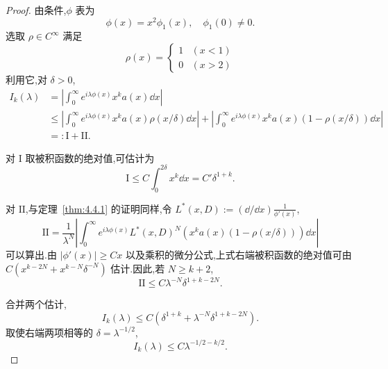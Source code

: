 \begin{proof}
由条件,$\phi$ 表为
\begin{equation*}
\phi(x) = x^{2}\phi_{1}(x), \quad \phi_{1}(0) \neq 0.
\end{equation*}
选取 $\rho \in C^{\infty}$ 满足
\begin{equation*}
\rho(x) = \begin{cases} 1 & (x < 1) \\ 0 & (x > 2) \end{cases}
\end{equation*}
利用它,对 $\delta > 0$,
\begin{equation}
\begin{aligned}
I_{k}(\lambda) & = \left|\int_{0}^{\infty}e^{i\lambda\phi(x)}x^{k}a(x)\dd x\right| \\
& \leq \left|\int_{0}^{\infty}e^{i\lambda\phi(x)}x^{k}a(x)\rho(x/\delta)\dd x\right| + \left|\int_{0}^{\infty}e^{i\lambda\phi(x)}x^{k}a(x)(1 - \rho(x/\delta))\dd x\right| \\
& =: \mathrm{I} + \mathrm{II}.
\end{aligned}
\end{equation}

对 $\mathrm{I}$ 取被积函数的绝对值,可估计为
\begin{equation*}
\mathrm{I} \leq C\int_{0}^{2\delta}x^{k}\dd x = C'\delta^{1+k}.
\end{equation*}

对 $\mathrm{II}$,与定理~\ref{thm:4.4.1} 的证明同样,令 $L^{*}(x, D) := (\dd/\dd x)\frac{1}{\phi'(x)}$,
\begin{equation*}
\mathrm{II} = \frac{1}{\lambda^{N}}\left|\int_{0}^{\infty}e^{i\lambda\phi(x)}L^{*}(x, D)^{N}\left(x^{k}a(x)(1 - \rho(x/\delta))\right)\dd x\right|
\end{equation*}
可以算出.由 $|\phi'(x)| \geq Cx$ 以及乘积的微分公式,上式右端被积函数的绝对值可由 $C(x^{k-2N} + x^{k-N}\delta^{-N})$ 估计.因此,若 $N \geq k + 2$,
\begin{equation*}
\mathrm{II} \leq C\lambda^{-N}\delta^{1+k-2N}.
\end{equation*}

合并两个估计,
\begin{equation*}
I_{k}(\lambda) \leq C\left(\delta^{1+k} + \lambda^{-N}\delta^{1+k-2N}\right).
\end{equation*}
取使右端两项相等的 $\delta = \lambda^{-1/2}$,
\begin{equation*}
I_{k}(\lambda) \leq C\lambda^{-1/2-k/2}.
\end{equation*}
\end{proof}

